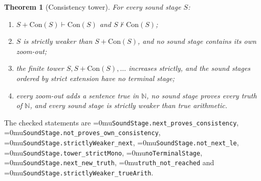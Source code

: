 \documentclass[11pt]{article}
\newcommand{\leanname}[1]{\textup{\Urlmuskip=0mu\relax\nolinkurl{#1}}}
\newtheorem{theorem}{Theorem}
\theoremstyle{definition}
\theoremstyle{remark}
\begin{document}
\begin{theorem}[Consistency tower]
For every sound stage $S$:
\begin{enumerate}[label=(\roman*)]
\item $S+\mathrm{Con}(S)\vdash\mathrm{Con}(S)$ and $S\nvdash\mathrm{Con}(S)$;
\item $S$ is strictly weaker than $S+\mathrm{Con}(S)$, and no sound stage contains
  its own zoom-out;
\item the finite tower $S, S+\mathrm{Con}(S),\ldots$ increases strictly, and the
  sound stages ordered by strict extension have no terminal stage;
\item every zoom-out adds a sentence true in $\mathbb N$, no sound stage proves
  every truth of $\mathbb N$, and every sound stage is strictly weaker than true
  arithmetic.
\end{enumerate}
\end{theorem}

The checked statements are \leanname{SoundStage.next_proves_consistency},
\leanname{SoundStage.not_proves_own_consistency},
\leanname{SoundStage.strictlyWeaker_next}, \leanname{SoundStage.not_next_le},
\leanname{SoundStage.tower_strictMono}, \leanname{noTerminalStage},
\leanname{SoundStage.next_new_truth}, \leanname{truth_not_reached} and
\leanname{SoundStage.strictlyWeaker_trueArith}.
\end{document}
